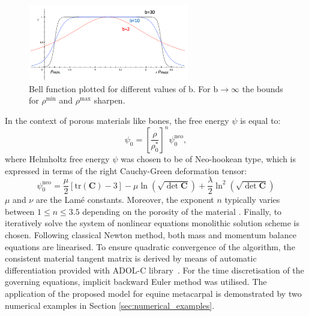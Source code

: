 \documentclass[11pt]{acmeArticle}
\numberwithin{equation}{section}
\begin{document}
\begin{figure}[h!]
	\begin{centering}
		\includegraphics[width=7cm]{Figures/graphs/bell_func.png}
		\caption{Bell function plotted for different values of $\mathrm b$. For $\mathrm b \rightarrow \infty$ the bounds for $ \rho{^\mathrm{min}}$ and $ \rho{^\mathrm{max}}$ sharpen.}
		\label{fig:bell_func}
	\end{centering}
\end{figure}
In the context of porous materials like bones, the free energy $\psi$ is equal to:
\begin{equation}
\psi_{0}=\left[\frac{\rho}{\rho_{0}^{\ast}}\right]^{n}\psi_{0}^{\mathrm{neo}},
\label{eq:free_energ}
\end{equation}
where Helmholtz free energy $\psi$ was chosen to be of Neo-hookean type, which is expressed in terms of the right Cauchy-Green deformation tensor: 
\begin{equation}
\psi_{0}^{\mathrm{neo}}=\frac{\mu}{2}\left[\textrm{tr}(\mathbf{C})-3\right]-\mu\ln(\sqrt{\det\mathbf{C}})+\frac{\lambda}{2}\ln^{2}(\sqrt{\det\mathbf{C}})
\end{equation}
$\mu$ and $\nu$ are the Lam\'e constants. Moreover, the exponent $n$ typically varies between $1 \leq n \leq 3.5$ depending on the porosity of the material \citep{Gibson2005}.
Finally, to iteratively solve the system of nonlinear equations monolithic solution scheme is chosen. Following classical Newton method, both mass and momentum balance equations are linearised. To ensure quadratic convergence of the algorithm, the consistent material tangent matrix is derived by means of automatic differentiation provided with ADOL-C library~\citep{Walther2009}. For the time discretisation of the governing equations, implicit backward Euler method was utilised. The application of the proposed model for equine metacarpal is demonstrated by two numerical examples in Section \ref{sec:numerical_examples}.
\end{document}

